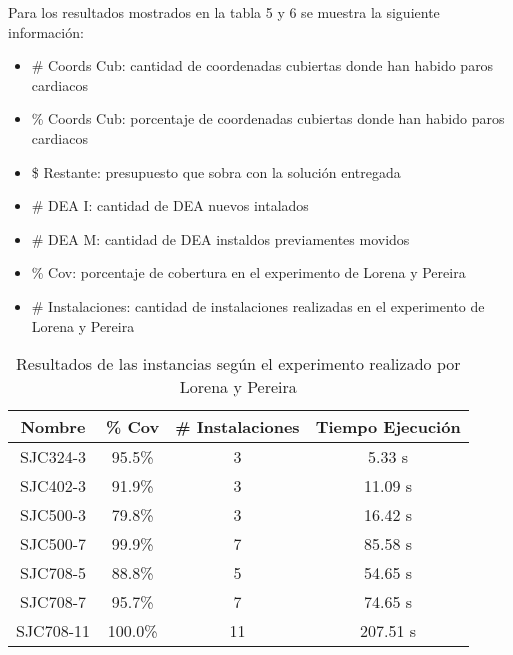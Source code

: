 \documentclass[letter, 10pt]{article}
\begin{document}
Para los resultados mostrados en la tabla 5 y 6 se muestra la siguiente informaci\'on:
\begin{itemize}
    \item \# Coords Cub: cantidad de coordenadas cubiertas donde han habido paros cardiacos
    \item \% Coords Cub: porcentaje de coordenadas cubiertas donde han habido paros cardiacos
    \item \$ Restante: presupuesto que sobra con la soluci\'on entregada
    \item \# DEA I: cantidad de DEA nuevos intalados
    \item \# DEA M: cantidad de DEA instaldos previamentes movidos
    \item \% Cov: porcentaje de cobertura en el experimento de Lorena y Pereira
    \item \# Instalaciones: cantidad de instalaciones realizadas en el experimento de Lorena y Pereira 
\end{itemize}

\begin{table}[h!]
    \centering
    \begin{tabular}{|c|c|c|c|}
    \hline
    Nombre & \% Cov & \# Instalaciones & Tiempo Ejecuci\'on\\
    \hline
    SJC324-3 & 95.5\% & 3 & 5.33 s\\
    \hline
    SJC402-3 & 91.9\% & 3 & 11.09 s\\
    \hline
    SJC500-3 & 79.8\% & 3 & 16.42 s\\
    \hline
    SJC500-7 & 99.9\% & 7 & 85.58 s\\
    \hline
    SJC708-5 & 88.8\% & 5 & 54.65 s\\
    \hline
    SJC708-7 & 95.7\% & 7 & 74.65 s\\
    \hline
    SJC708-11 & 100.0\% & 11 & 207.51 s\\
    \hline
    
    \end{tabular}
    \caption{Resultados de las instancias seg\'un el experimento realizado por Lorena y Pereira \cite{Lorena}}
    \label{tab:caract}
\end{table}
\end{document}
